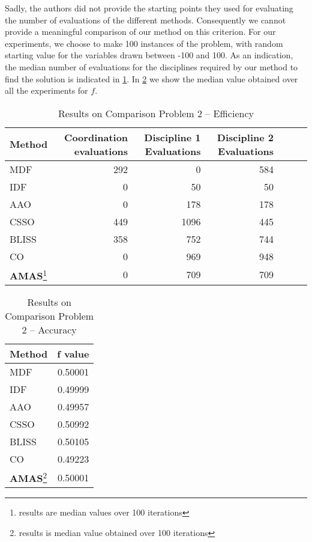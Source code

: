 Sadly, the authors did not provide the starting points they used for evaluating the number of evaluations of the different methods. Consequently we cannot provide a meaningful comparison of our method on this criterion. For our experiments, we choose to make 100 instances of the problem, with random starting value for the variables drawn between -100 and 100. As an indication, the median number of evaluations for the disciplines required by our method to find the solution is indicated in \tablename{} \ref{bench2_efficiency}. In \tablename{} \ref{bench2_accuracy} we show the median value obtained over all the experiments for $f$. 

\begin{savenotes}
\begin{table}
\caption{Results on Comparison Problem 2  -- Efficiency}\label{bench2_efficiency}
\centering
\begin{tabular}{lrrrrrr}
\toprule
Method & Coordination evaluations & Discipline 1 Evaluations & Discipline 2 Evaluations \\
\midrule
MDF					&	292	&	0			&	584	\\
IDF						&	0		&	50		&	50	\\
AAO					&	0		&	178		&	178	\\
CSSO					&	449	&	1096	&	445	\\
BLISS					&	358	&	752		&	744	\\
CO						&	0		&	969		&	948	\\
\textbf{AMAS}\footnote{results are median values over 100 iterations}	&	0	&	709	&	709	\\
\bottomrule
\end{tabular}
\end{table}
\end{savenotes}

\begin{savenotes}
\begin{table}[h]
\caption{Results on Comparison Problem 2 -- Accuracy}\label{bench2_accuracy}
\centering
\begin{tabular}{lr}
\toprule
Method & f value \\
\midrule
MDF			&		0.50001	\\
IDF				&		0.49999	\\
AAO			&		0.49957	\\
CSSO			&		0.50992	\\
BLISS			&		0.50105	\\
CO				&		0.49223	\\
\textbf{AMAS}\footnote{results is median value obtained over 100 iterations}	&	0.50001	 \\
\bottomrule
\end{tabular}
\end{table}
\end{savenotes}

